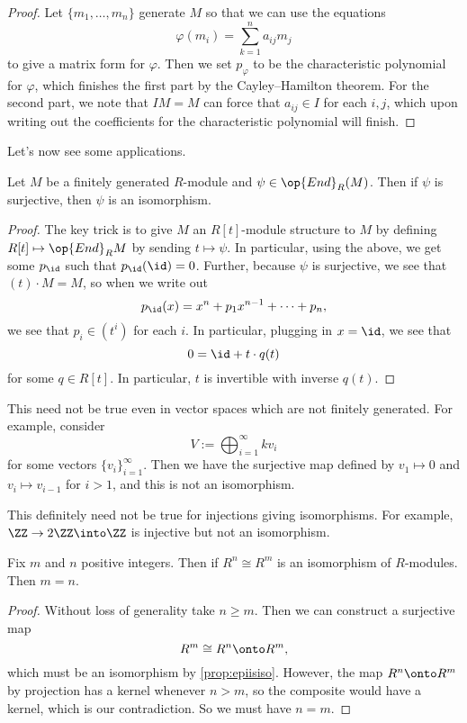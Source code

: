 \begin{proof}
	Let $\{m_1,\ldots,m_n\}$ generate $M$ so that we can use the equations
	\[\varphi(m_i)=\sum_{k=1}^na_{ij}m_j\]
	to give a matrix form for $\varphi$. Then we set $p_\varphi$ to be the characteristic polynomial for $\varphi$, which finishes the first part by the Cayley--Hamilton theorem. For the second part, we note that $IM=M$ can force that $a_{ij}\in I$ for each $i,j$, which upon writing out the coefficients for the characteristic polynomial will finish.
\end{proof}
Let's now see some applications.
\begin{proposition} \label{prop:epiisiso}
	Let $M$ be a finitely generated $R$-module and $\psi\in\op{End}_R(M)$. Then if $\psi$ is surjective, then $\psi$ is an isomorphism.
\end{proposition}
\begin{proof}
	The key trick is to give $M$ an $R[t]$-module structure to $M$ by defining $R[t]\mapsto\op{End}_RM$ by sending $t\mapsto\psi$.
	In particular, using the above, we get some $p_{\id}$ such that $p_{\id}({\id})=0$.
	Further, because $\psi$ is surjective, we see that $(t)\cdot M=M$, so when we write out
	\[p_{\id}(x)=x^n+p_1x^{n-1}+\cdots+p_n,\]
	we see that $p_i\in\left(t^i\right)$ for each $i$. In particular, plugging in $x=\id$, we see that
	\[0=\id+t\cdot q(t)\]
	for some $q\in R[t]$. In particular, $t$ is invertible with inverse $q(t)$.
\end{proof}
\begin{remark}
	This need not be true even in vector spaces which are not finitely generated. For example, consider
	\[V:=\bigoplus_{i=1}^\infty kv_i\]
	for some vectors $\{v_i\}_{i=1}^\infty$. Then we have the surjective map defined by $v_1\mapsto0$ and $v_i\mapsto v_{i-1}$ for $i>1$, and this is not an isomorphism.
\end{remark}
\begin{remark}
	This definitely need not be true for injections giving isomorphisms. For example, $\ZZ\to2\ZZ\into\ZZ$ is injective but not an isomorphism.
\end{remark}
\begin{corollary}
	Fix $m$ and $n$ positive integers. Then if $R^n\cong R^m$ is an isomorphism of $R$-modules. Then $m=n$.
\end{corollary}
\begin{proof}
	Without loss of generality take $n\ge m$. Then we can construct a surjective map
	\[R^m\cong R^n\onto R^m,\]
	which must be an isomorphism by \autoref{prop:epiisiso}. However, the map $R^n\onto R^m$ by projection has a kernel whenever $n>m$, so the composite would have a kernel, which is our contradiction. So we must have $n=m$.
\end{proof}

